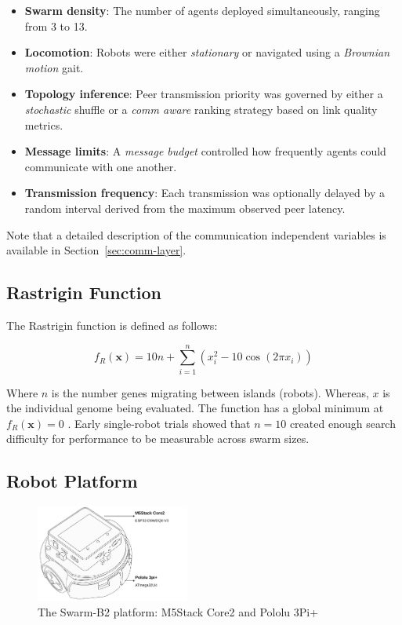 \documentclass[conference]{IEEEtran}
\begin{document}
\begin{itemize}
  \item \textbf{Swarm density}: The number of agents deployed simultaneously, ranging from 3 to 13.
  \item \textbf{Locomotion}: Robots were either \emph{stationary} or navigated using a \emph{Brownian motion} gait.
  \item \textbf{Topology inference}: Peer transmission priority was governed by either a \emph{stochastic} shuffle or a \emph{comm aware} ranking strategy based on link quality metrics.
  \item \textbf{Message limits}: A \emph{message budget} controlled how frequently agents could communicate with one another.
  \item \textbf{Transmission frequency}: Each transmission was optionally delayed by a random interval derived from the maximum observed peer latency.
\end{itemize}

Note that a detailed description of the communication independent variables is available in Section~\ref{sec:comm-layer}.

\subsection{Rastrigin Function}

The Rastrigin function is defined as follows:

\begin{equation}\label{eq:rastrigin}
f_R(\mathbf{x}) = 10n + \sum_{i=1}^{n} \left(x_i^2 - 10\cos(2\pi x_i)\right)
\end{equation}

Where $n$ is the number genes migrating between islands (robots). Whereas, $x$ is the individual genome being evaluated. The function has a global minimum at \( f_R(\mathbf{x}) = 0 \) \cite{rucinski_impact_2010}. Early single-robot trials showed that $n=10$ created enough search difficulty for performance to be measurable across swarm sizes.

\subsection{Robot Platform}\label{sec:robot_platform}
\begin{figure}[h]
    \centering
    \includegraphics[width=0.45\textwidth]{B2.pdf}
    \caption{The Swarm-B2 platform: M5Stack Core2 and Pololu 3Pi+}
    \label{fig:B2}
\end{figure}
\end{document}
